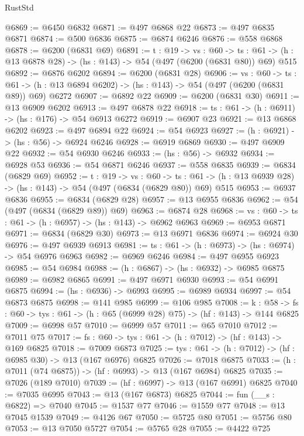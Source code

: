 \begin{lexlean}{RustStd}
\begin{coremodule}
@6869 := @6450 @6832
@6871 := @497 @6868 @22
@6873 := @497 @6835 @6871
@6874 := @500 @6836
@6875 := @6874 @6246
@6876 := @558 @6868
@6878 := @6200 (@6831 @69)
@6891 := {t : @19} ->
  {vs : @60} ->
  {ts : @61} -> (h : @13 @6878 @28) -> (hs : @143) -> @54 (@497 (@6200 (@6831 @80)) @69) @515
@6892 := @6876 @6202
@6894 := @6200 (@6831 @28)
@6906 := {vs : @60} ->
  {ts : @61} -> (h : @13 @6894 @6202) -> (hs : @143) -> @54 (@497 (@6200 (@6831 @89)) @69) @6272
@6907 := @6892 @22
@6909 := @6200 (@6831 @30)
@6911 := @13 @6909 @6202
@6913 := @497 @6878 @22
@6918 := {ts : @61} -> (h : @6911) -> (hs : @176) -> @54 @6913 @6272
@6919 := @6907 @23
@6921 := @13 @6868 @6202
@6923 := @497 @6894 @22
@6924 := @54 @6923
@6927 := (h : @6921) -> (hs : @56) -> @6924 @6246
@6928 := @6919 @6869
@6930 := @497 @6909 @22
@6932 := @54 @6930 @6246
@6933 := (hs : @56) -> @6932
@6934 := @6928 @53
@6936 := @54 @6871 @6246
@6937 := @558 @6835
@6939 := @6834 (@6829 @69)
@6952 := {t : @19} ->
  {vs : @60} ->
  {ts : @61} -> (h : @13 @6939 @28) -> (hs : @143) -> @54 (@497 (@6834 (@6829 @80)) @69) @515
@6953 := @6937 @6836
@6955 := @6834 (@6829 @28)
@6957 := @13 @6955 @6836
@6962 := @54 (@497 (@6834 (@6829 @89)) @69)
@6963 := @6874 @28
@6968 := {vs : @60} -> {ts : @61} -> (h : @6957) -> (hs : @143) -> @6962 @6963
@6969 := @6953 @6871
@6971 := @6834 (@6829 @30)
@6973 := @13 @6971 @6836
@6974 := @6924 @30
@6976 := @497 @6939 @6913
@6981 := {ts : @61} -> (h : @6973) -> (hs : @6974) -> @54 @6976 @6963
@6982 := @6969 @6246
@6984 := @497 @6955 @6923
@6985 := @54 @6984
@6988 := (h : @6867) -> (hs : @6932) -> @6985 @6875
@6989 := @6982 @6865
@6991 := @497 @6971 @6930
@6993 := @54 @6991 @6875
@6994 := (hs : @6936) -> @6993
@6995 := @6989 @6934
@6997 := @54 @6873 @6875
@6998 := @141 @985
@6999 := @106 @985
@7008 := {k : @58} ->
  {fs : @60} -> {tys : @61} -> (h : @65 (@6999 @28) @75) -> (hf : @143) -> @144 @6825
@7009 := @6998 @57
@7010 := @6999 @57
@7011 := @65 @7010
@7012 := @7011 @75
@7017 := {fs : @60} -> {tys : @61} -> (h : @7012) -> (hf : @143) -> @169 @6825
@7018 := @7009 @6873
@7025 := {tys : @61} -> (h : @7012) -> (hf : @6985 @30) -> @13 (@167 @6976) @6825
@7026 := @7018 @6875
@7033 := (h : @7011 (@74 @6875)) -> (hf : @6993) -> @13 (@167 @6984) @6825
@7035 := @7026 (@189 @7010)
@7039 := (hf : @6997) -> @13 (@167 @6991) @6825
@7040 := @7035 @6995
@7043 := @13 (@167 @6873) @6825
@7044 := fun (__s : @6822) => @7040
@7045 := @1537 @77
@7046 := @1559 @77
@7048 := @13 @7045 @1539
@7049 := @4126 @67
@7050 := @5725 @80
@7051 := @5756 @80
@7053 := @13 @7050 @5727
@7054 := @5765 @28
@7055 := @4422 @725

\end{coremodule}
\end{lexlean}
